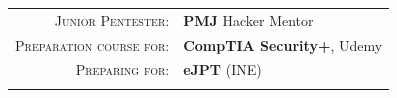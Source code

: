 \renewcommand{\arraystretch}{1.1}

\begin{tabular}{>{}r>{}p{13cm}} 
    \textsc{Junior Pentester:}      &   \textbf{PMJ} Hacker Mentor\\ 
    \textsc{Preparation course for:}         &   \textbf{CompTIA Security+}, Udemy\\
    \textsc{Preparing for:}         &   \textbf{eJPT} (INE)\\ 
    
    
\newline
\end{tabular}